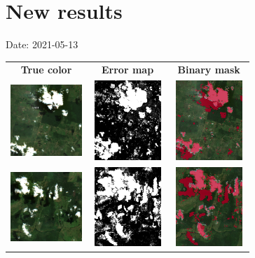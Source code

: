 \documentclass{beamer}
\begin{document}
\section{New results}
\begin{frame}{Date: 2021-05-13}
    \begin{tabular}{ccc}
        \textbf{True color} & \textbf{Error map} & \textbf{Binary mask}\\
        \includegraphics[width=2.7cm,height=3cm]{Figures/v6/20210513/TCI_zoom1.png}& \includegraphics[width=2.7cm,height=3cm]{Figures/v6/20210513/error_map_zoom1.png} &\includegraphics[width=2.7cm,height=3cm]{Figures/v6/20210513/zoom1_BI.png}\\
        \includegraphics[width=2.7cm,height=3cm]{Figures/v6/20210513/TCI_zoom2.png}& \includegraphics[width=2.7cm,height=3cm]{Figures/v6/20210513/error_map_zoom2.png} &\includegraphics[width=2.7cm,height=3cm]{Figures/v6/20210513/zoom2_BI.png}\\
        \end{tabular}
\end{frame}
\end{document}
